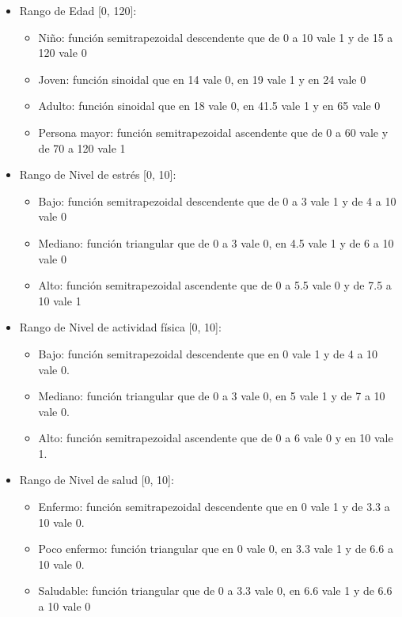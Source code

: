 \documentclass[11pt]{article}
\begin{document}
\begin{itemize}
    \item Rango de Edad [0, 120]:
        \begin{itemize}
            \item Niño: función semitrapezoidal descendente que de 0 a 10 vale 1 y de 15 a 120 vale 0
            \item Joven: función sinoidal que en 14 vale 0, en 19 vale 1 y en 24 vale 0
            \item Adulto: función sinoidal que en 18 vale 0, en 41.5 vale 1 y en 65 vale 0
            \item Persona mayor: función semitrapezoidal ascendente que de 0 a 60 vale y de 70 a 120 vale 1
        \end{itemize}
    \item Rango de Nivel de estrés [0, 10]:
        \begin{itemize}
            \item Bajo: función semitrapezoidal descendente que de 0 a 3 vale 1 y de 4 a 10 vale 0
            \item Mediano: función triangular que de 0 a 3 vale 0, en 4.5 vale 1 y de 6 a 10 vale 0
            \item Alto: función semitrapezoidal ascendente que de 0 a 5.5 vale 0 y de 7.5 a 10 vale 1
        \end{itemize}
    \item Rango de Nivel de actividad física [0, 10]:
        \begin{itemize}
            \item Bajo: función semitrapezoidal descendente que en 0 vale 1 y de 4 a 10 vale 0.
            \item Mediano: función triangular que de 0 a 3 vale 0, en 5 vale 1 y de 7 a 10 vale 0.
            \item Alto: función semitrapezoidal ascendente que de 0 a 6 vale 0 y en 10 vale 1.
        \end{itemize}
    \item Rango de Nivel de salud [0, 10]:
        \begin{itemize}
            \item Enfermo: función semitrapezoidal descendente que en 0 vale 1 y de 3.3 a 10 vale 0.
            \item Poco enfermo: función triangular que en 0 vale 0, en 3.3 vale 1 y de 6.6 a 10 vale 0.
            \item Saludable: función triangular que de 0 a 3.3 vale 0, en 6.6 vale 1 y de 6.6 a 10 vale 0

\end{itemize}
\end{itemize}
\end{document}
